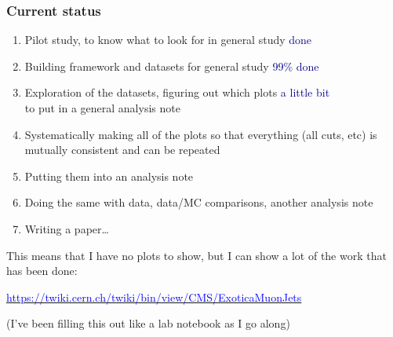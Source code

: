\documentclass[compress]{beamer}
\begin{document}
\begin{frame}
\frametitle{Current status}
\begin{enumerate}
\item Pilot study, to know what to look for in general study \hfill \textcolor{darkblue}{done}
\item Building framework and datasets for general study \hfill \textcolor{darkblue}{99\% done}
\item Exploration of the datasets, figuring out which plots \hfill \textcolor{darkblue}{a little bit} \\ to put in a general analysis note
\item Systematically making all of the plots so that everything (all cuts, etc) is mutually consistent and can be repeated
\item Putting them into an analysis note
\item Doing the same with data, data/MC comparisons, another analysis note
\item Writing a paper\ldots
\end{enumerate}

\vfill
This means that I have no plots to show, but I can show a lot of the work that has been done:

\href{https://twiki.cern.ch/twiki/bin/view/CMS/ExoticaMuonJets}{\textcolor{blue}{https://twiki.cern.ch/twiki/bin/view/CMS/ExoticaMuonJets}}

(I've been filling this out like a lab notebook as I go along)
\end{frame}
\end{document}

